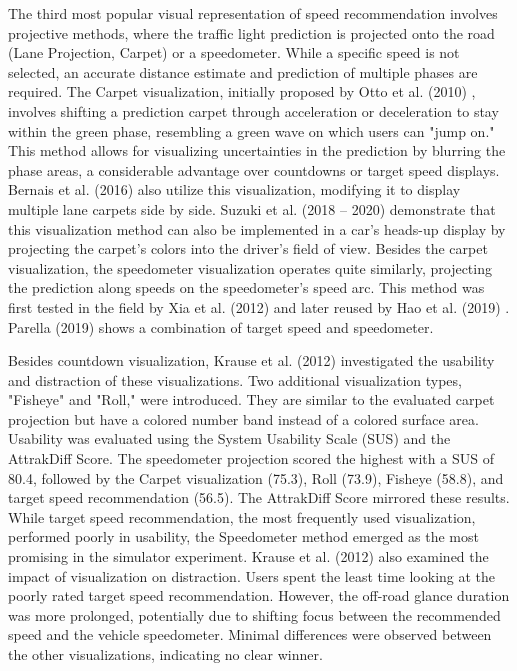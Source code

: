 The third most popular visual representation of speed recommendation involves projective methods, where the traffic light prediction is projected onto the road (Lane Projection, Carpet) or a speedometer. While a specific speed is not selected, an accurate distance estimate and prediction of multiple phases are required. The Carpet visualization, initially proposed by Otto et al. (2010) \cite{otto_operating_2010}, involves shifting a prediction carpet through acceleration or deceleration to stay within the green phase, resembling a green wave on which users can "jump on." This method allows for visualizing uncertainties in the prediction by blurring the phase areas, a considerable advantage over countdowns or target speed displays. Bernais et al. (2016) \cite{bernais_design_2016} also utilize this visualization, modifying it to display multiple lane carpets side by side. Suzuki et al. (2018 -- 2020) \cite{suzuki_new_2018, suzuki_safety_2020} demonstrate that this visualization method can also be implemented in a car's heads-up display by projecting the carpet's colors into the driver's field of view. Besides the carpet visualization, the speedometer visualization operates quite similarly, projecting the prediction along speeds on the speedometer's speed arc. This method was first tested in the field by Xia et al. (2012) \cite{xia_field_2012} and later reused by Hao et al. (2019) \cite{hao_eco-approach_2019}. Parella (2019) \cite{marias_parella_design_2019} shows a combination of target speed and speedometer.

Besides countdown visualization, Krause et al. (2012) \cite{krause_traffic_2012} investigated the usability and distraction of these visualizations. Two additional visualization types, "Fisheye" and "Roll," were introduced. They are similar to the evaluated carpet projection but have a colored number band instead of a colored surface area. Usability was evaluated using the System Usability Scale (SUS) and the AttrakDiff Score. The speedometer projection scored the highest with a SUS of 80.4, followed by the Carpet visualization (75.3), Roll (73.9), Fisheye (58.8), and target speed recommendation (56.5). The AttrakDiff Score mirrored these results. While target speed recommendation, the most frequently used visualization, performed poorly in usability, the Speedometer method emerged as the most promising in the simulator experiment. Krause et al. (2012) \cite{krause_traffic_2012} also examined the impact of visualization on distraction. Users spent the least time looking at the poorly rated target speed recommendation. However, the off-road glance duration was more prolonged, potentially due to shifting focus between the recommended speed and the vehicle speedometer. Minimal differences were observed between the other visualizations, indicating no clear winner.


